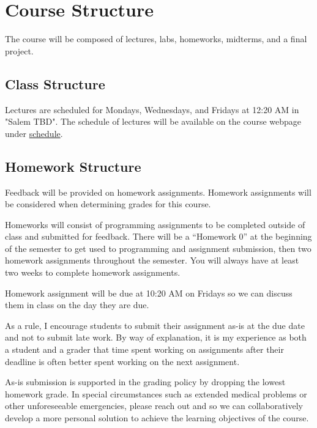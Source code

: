 \documentclass[11pt]{article}
\begin{document}

\section*{Course Structure}

The course will be composed of lectures, labs, homeworks, midterms, and a final project.

\subsection*{Class Structure}

Lectures are scheduled for Mondays, Wednesdays, and Fridays at 12:20 AM in "Salem TBD". The schedule
of lectures will be available on the course webpage under \href{https://cd-public.github.io/courses/computer_security/s-399s22.html}{schedule}.

\subsection*{Homework Structure}

Feedback will be provided on homework assignments. Homework assignments will be considered when determining grades for this course.

Homeworks will consist of programming assignments to be completed outside of class and submitted
for feedback. There will be a ``Homework 0'' at the beginning of the semester to get used to
programming and assignment submission, then two homework assignments throughout the semester.
You will always have at least two weeks to complete homework assignments.

Homework assignment will be due at 10:20 AM on Fridays so we can discuss them in class on the
day they are due.

As a rule, I encourage students to submit their assignment as-is at the due date and not to
submit late work. By way of explanation, it is my experience as both a student and a grader that time spent working on assignments after their deadline is often better spent working on the next assignment.

As-is submission is supported in the grading policy by dropping the lowest homework
grade. In special circumstances such as extended medical problems or other unforeseeable
emergencies, please reach out and so we can collaboratively develop a more personal
solution to achieve the learning objectives of the course.
\end{document}
